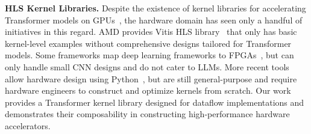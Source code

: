 \noindent\textbf{HLS Kernel Libraries.}
Despite the existence of kernel libraries for accelerating Transformer models on GPUs~\cite{dao2022flashattention,wolf2019huggingface,xFormers2022}, the hardware domain has seen only a handful of initiatives in this regard.
AMD provides Vitis HLS library~\cite{vitis_hls_library,vitis_ai} that only has basic kernel-level examples without comprehensive designs tailored for Transformer models.
Some frameworks map deep learning frameworks to FPGAs~\cite{zhang2018dnnbuilder,fahim2021hls4ml,yaman2017finn,blott2018finnr,zhang2020dnnexplorer}, but can only handle small CNN designs and do not cater to LLMs.
More recent tools allow hardware design using Python~\cite{lai2019heterocl,xiang2022heteroflow,huang2021pylog,yehpca2022scalehls,debjit2022dac}, but are still general-purpose and require hardware engineers to construct and optimize kernels from scratch.
Our work provides a Transformer kernel library designed for dataflow implementations and demonstrates their composability in constructing high-performance hardware accelerators.
